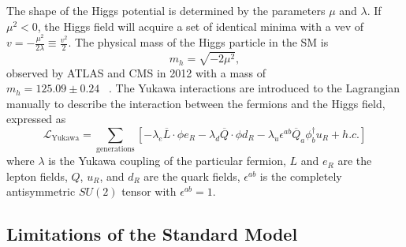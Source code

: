 The shape of the Higgs potential is determined by the parameters $\mu$ and $\lambda$. 
If $\mu^2 < 0$, the Higgs field will acquire a set of identical minima with a vev of 
$v=-\frac{\mu^2}{2\lambda} \equiv \frac{v^2}{2}$. The physical mass of the Higgs particle in the SM is
\begin{equation}
m_h = \sqrt{-2\mu^2},
\label{eq:theory.sm.mh}
\end{equation}
observed by ATLAS and CMS in 2012 with a mass of \\
$m_h = 125.09 \pm 0.24$ \GeV~\cite{atlas_higgs,cms_higgs}.
The Yukawa interactions are introduced to the Lagrangian manually to describe the interaction between the fermions and the Higgs field, 
expressed as 
\begin{equation}
 \mathcal{L}_\text{Yukawa} = \sum_\text{generations} \left[-\lambda_e \overline{L} \cdot \phi e_R - \lambda_d \overline{Q} \cdot \phi d_R 
 - \lambda_u \epsilon^{ab} \overline{Q}_a \phi_b^{\dagger} u_R + h.c. \right]
\end{equation}
where $\lambda$ is the Yukawa coupling of the particular fermion, $L$ and $e_R$ are the lepton fields, 
$Q$, $u_R$, and $d_R$ are the quark fields, $\epsilon^{ab} $ is the completely antisymmetric  $ SU\left(2\right) $ tensor 
with $\epsilon^{ab} = 1$.


\subsection{Limitations of the Standard Model}

